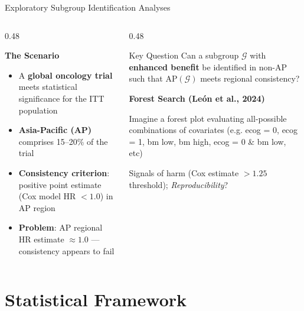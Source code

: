\documentclass[
  ignorenonframetext,
  aspectratio=169]{beamer}
\begin{document}
\begin{frame}{Exploratory Subgroup Identification Analyses}
\label{exploratory-subgroup-identification-analyses}
\begin{columns}[T]
\begin{column}{0.48\textwidth}

\textbf{The Scenario}

\begin{itemize}
\item A \textbf{global oncology trial} meets statistical significance for the ITT population
\item \textbf{Asia-Pacific (AP)} comprises 15--20\% of the trial
\item \textbf{Consistency criterion}: positive point estimate (Cox model HR $< 1.0$) in AP region
\item \textbf{Problem}: AP regional HR estimate $\approx 1.0$ --- consistency appears to fail
\end{itemize}

\end{column}
\begin{column}{0.48\textwidth}

\begin{block}{Key Question}
Can a subgroup $\mathcal{G}$ with \textbf{enhanced benefit} be identified in non-AP such that AP$(\mathcal{G})$ meets regional consistency?
\end{block}

\smallskip

\textbf{Forest Search (León et al., 2024)}

\smallskip

Imagine a forest plot evaluating all-possible combinations of covariates (e.g. ecog = 0, ecog = 1, bm low, bm high, ecog = 0 \& bm low, etc) 

\smallskip

Signals of harm (Cox estimate $> 1.25$ threshold); \textit{Reproducibility}? 

\end{column}
\end{columns}
\end{frame}

\section{Statistical Framework}\label{statistical-framework}
\end{document}
